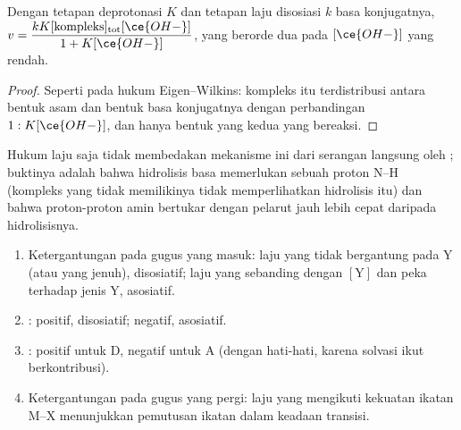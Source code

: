\begin{proposition}\label{prop:b3:complex-mechanisms:conjugate-base}
Dengan tetapan deprotonasi $K$ dan tetapan laju disosiasi $k$ basa
konjugatnya, $v = \dfrac{kK[\text{kompleks}]_{\mathrm{tot}}[\ce{OH-}]}{1 + K[\ce{OH-}]}$, yang berorde dua pada $[\ce{OH-}]$ yang rendah.
\end{proposition}

\begin{proof}
Seperti pada hukum Eigen--Wilkins: kompleks itu terdistribusi antara bentuk
asam dan bentuk basa konjugatnya dengan perbandingan $1 : K[\ce{OH-}]$, dan hanya bentuk yang kedua yang bereaksi.
\end{proof}

Hukum laju saja tidak membedakan mekanisme ini dari serangan langsung oleh
; buktinya adalah bahwa hidrolisis basa memerlukan sebuah proton N--H (kompleks yang
tidak memilikinya tidak memperlihatkan hidrolisis itu) dan bahwa proton-proton
amin bertukar dengan pelarut jauh lebih cepat daripada hidrolisisnya.

\begin{method}\label{met:b3:complex-mechanisms:diagnose}
\begin{enumerate}
  \item Ketergantungan pada gugus yang masuk: laju yang tidak bergantung pada Y (atau yang jenuh),
        disosiatif; laju yang sebanding dengan $[\mathrm Y]$ dan peka terhadap jenis Y,
        asosiatif.
  \item {}: positif, disosiatif; negatif, asosiatif.
  \item {}: positif untuk D, negatif untuk A (dengan hati-hati, karena
        solvasi ikut berkontribusi).
  \item Ketergantungan pada gugus yang pergi: laju yang mengikuti kekuatan ikatan M--X
        menunjukkan pemutusan ikatan dalam keadaan transisi.
\end{enumerate}
\end{method}

